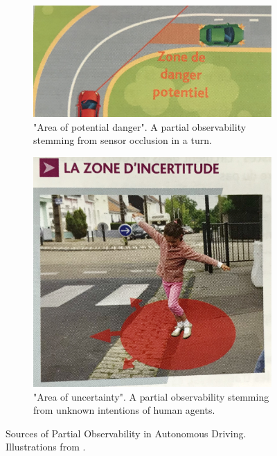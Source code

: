 \begin{figure}[th]
	\centering
	\begin{subfigure}[b]{.7\linewidth}
		\includegraphics[width=\linewidth]{img/po-sensors}
		\caption{"Area of potential danger". A partial observability stemming from sensor occlusion in a turn.}
		\label{fig:po-occlusion}
	\end{subfigure}
	\begin{subfigure}[b]{.4\linewidth}
		\includegraphics[width=\linewidth]{img/po-intentions}
		\caption{"Area of uncertainty". A partial observability stemming from unknown intentions of human agents.}
		\label{fig:po-intentions}
	\end{subfigure}
	\caption{Sources of Partial Observability in Autonomous Driving. Illustrations from \citep{ObjCode2017}.}
	\label{fig:partial-observability}
\end{figure}
